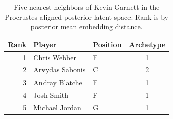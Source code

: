 \begin{table}[htbp]
  \centering\small
  \begin{tabular}{rllc}
    \toprule
    Rank & Player & Position & Archetype \\
    \midrule
    1 & Chris Webber & F & 1 \\
    2 & Arvydas Sabonis & C & 2 \\
    3 & Andray Blatche & F & 1 \\
    4 & Josh Smith & F & 1 \\
    5 & Michael Jordan & G & 1 \\
    \bottomrule
  \end{tabular}
  \caption{Five nearest neighbors of Kevin Garnett in the Procrustes-aligned posterior latent space. Rank is by posterior mean embedding distance.}
  \label{tab:Kevin_Garnett_neighbors}
\end{table}

